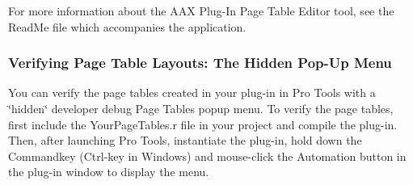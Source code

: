 For more information about the A\+A\+X Plug-\/\+In Page Table Editor tool, see the Read\+Me file which accompanies the application.

\hypertarget{a00363_verifying_page_table_layouts_the_hidden_popup_menu}{}\subsubsection{Verifying Page Table Layouts\+: The Hidden Pop-\/\+Up Menu}\label{a00363_verifying_page_table_layouts_the_hidden_popup_menu}
You can verify the page tables created in your plug-\/in in Pro Tools with a \char`\"{}hidden\char`\"{} developer debug Page Tables popup menu. To verify the page tables, first include the Your\+Page\+Tables.\+r file in your project and compile the plug-\/in. Then, after launching Pro Tools, instantiate the plug-\/in, hold down the Commandkey (Ctrl-\/key in Windows) and mouse-\/click the Automation button in the plug-\/in window to display the menu.


